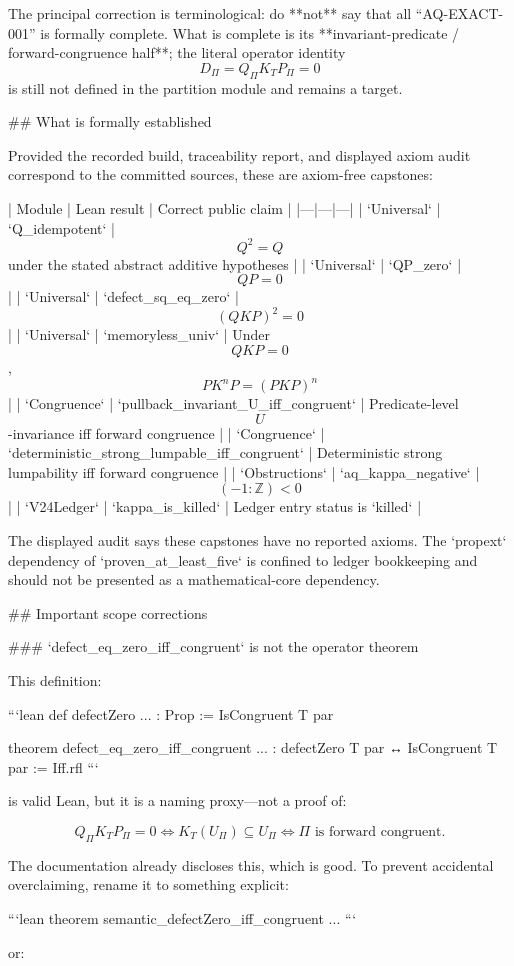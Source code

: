 The principal correction is terminological: do **not** say that all “AQ-EXACT-001” is formally complete. What is complete is its **invariant-predicate / forward-congruence half**; the literal operator identity $$D_\Pi=Q_\Pi K_TP_\Pi=0$$ is still not defined in the partition module and remains a target.

## What is formally established

Provided the recorded build, traceability report, and displayed axiom audit correspond to the committed sources, these are axiom-free capstones:

| Module | Lean result | Correct public claim |
|---|---|---|
| `Universal` | `Q_idempotent` | $$Q^2=Q$$ under the stated abstract additive hypotheses |
| `Universal` | `QP_zero` | $$QP=0$$ |
| `Universal` | `defect_sq_eq_zero` | $$(QKP)^2=0$$ |
| `Universal` | `memoryless_univ` | Under $$QKP=0$$, $$PK^nP=(PKP)^n$$ |
| `Congruence` | `pullback_invariant_U_iff_congruent` | Predicate-level $$U$$-invariance iff forward congruence |
| `Congruence` | `deterministic_strong_lumpable_iff_congruent` | Deterministic strong lumpability iff forward congruence |
| `Obstructions` | `aq_kappa_negative` | $$(-1:\mathbb Z)<0$$ |
| `V24Ledger` | `kappa_is_killed` | Ledger entry status is `killed` |

The displayed audit says these capstones have no reported axioms. The `propext` dependency of `proven_at_least_five` is confined to ledger bookkeeping and should not be presented as a mathematical-core dependency.

## Important scope corrections

### `defect_eq_zero_iff_congruent` is not the operator theorem

This definition:

```lean
def defectZero ... : Prop := IsCongruent T par

theorem defect_eq_zero_iff_congruent ... :
    defectZero T par ↔ IsCongruent T par := Iff.rfl
```

is valid Lean, but it is a naming proxy—not a proof of:

$$
Q_\Pi K_TP_\Pi=0
\iff
K_T(U_\Pi)\subseteq U_\Pi
\iff
\Pi\text{ is forward congruent}.
$$

The documentation already discloses this, which is good. To prevent accidental overclaiming, rename it to something explicit:

```lean
theorem semantic_defectZero_iff_congruent ...
```

or:

